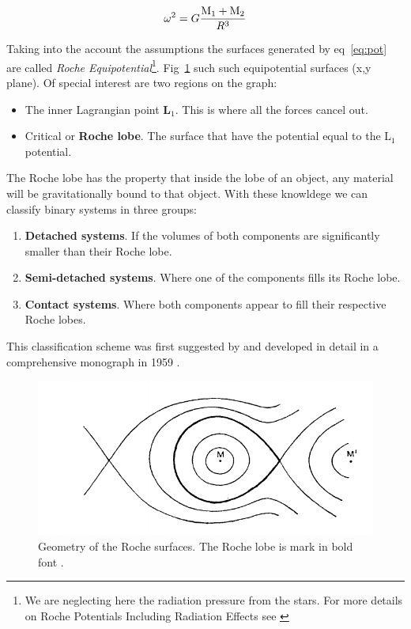 \begin{equation}
        \omega ^2 = G \frac{\text M _1 + \text M _2}{R^3}
        \label{eq:roche}
\end{equation}

Taking into the account the assumptions the surfaces generated by eq~\ref{eq:pot} are called \emph{Roche Equipotential}\footnote{We are neglecting here the radiation pressure from the stars. For more details on Roche Potentials Including Radiation Effects see \cite{schuerman_roche_1972}}. Fig~\ref{fig:roche} such such equipotential surfaces (x,y plane). Of special interest are two regions on the graph:
\begin{itemize}
        \item The inner Lagrangian point \textbf{L$_1$}. This is where all the forces cancel out. 
        \item Critical or \textbf{Roche lobe}. The surface that have the potential equal to the L$_1$ potential. 
\end{itemize}

The Roche lobe has the property that inside the lobe of an object, any material will be gravitationally bound to that object. With these knowldege we can classify binary systems in three groups:

\begin{enumerate}
        \item \textbf{Detached systems}. If the volumes of both components are significantly smaller than their Roche lobe. 
        \item \textbf{Semi-detached systems}. Where one of the components fills its Roche lobe.
        \item \textbf{Contact systems}. Where both components appear to fill their respective Roche lobes. 
\end{enumerate}

This classification scheme was first suggested by \citep{kopal_classification_1955} and developed in detail in a comprehensive monograph in 1959 \citep{kopal_close_1959}. 

\begin{figure}[]
        \centering
\includegraphics[scale=.3]{assets/images/kopalroche.png}
\caption{Geometry of the Roche surfaces. The Roche lobe is mark in bold font \citep{kopal_close_1959}.}
\label{fig:roche}
\end{figure}



